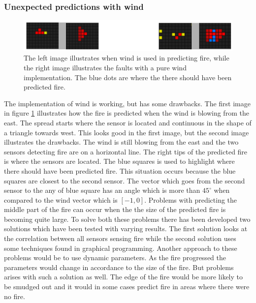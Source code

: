 \subsubsection{Unexpected predictions with wind}
\label{wind-problem}
\begin{figure}[here]
  \centering
      \includegraphics[width=1.0\textwidth]{solution/graphics/wind-problem.png}
  \caption{The left image illustrates when wind is used in predicting fire, while the right image illustrates the faults with a pure wind implementation. The blue dots are where the there should have been predicted fire.}
  \label{fig:wind-problem}
\end{figure}
The implementation of wind is working, but has some drawbacks. The first image in figure \ref{fig:wind-problem} illustrates how the fire is predicted when the wind is blowing from the east. The spread starts where the sensor is located and continuous in the shape of a triangle towards west. This looks good in the first image, but the second image illustrates the drawbacks. The wind is still blowing from the east and the two sensors detecting fire are on a horizontal line. The right tips of the predicted fire is where the sensors are located. The blue squares is used to highlight where there should have been predicted fire. This situation occurs because the blue squares are closest to the second sensor. The vector which goes from the second sensor to the any of blue square has an angle which is more than $ 45^{\circ} $ when compared to the wind vector which is $ \left[-1,0\right] $. Problems with predicting the middle part of the fire can occur when the the size of the predicted fire is becoming quite large. To solve both these problems there has been developed two solutions which have been tested with varying results. The first solution looks at the correlation between all sensors sensing fire while the second solution uses some techniques found in graphical programming. Another approach to these problems would be to use dynamic parameters. As the fire progressed the parameters would change in accordance to the size of the fire. But problems arises with such a solution as well. The edge of the fire would be more likely to be smudged out and it would in some cases predict fire in areas where there were no fire.
